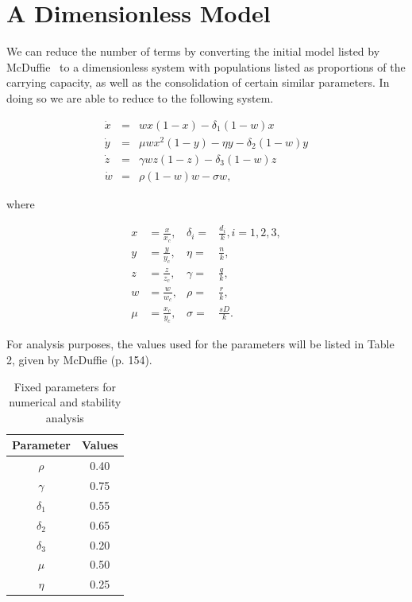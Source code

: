 \documentclass[12pt]{article}
\begin{document}
\section{A Dimensionless Model}
\indent\indent We can reduce the number of terms by converting the initial model listed by McDuffie~\cite{mcduffie} to a dimensionless system with populations listed as proportions of the carrying capacity, as well as the consolidation of certain similar parameters. In doing so we are able to reduce to the following system.

\begin{eqnarray*}
    \Dot{x} & = & wx(1 - x) - \delta_1(1 - w)x\\
    \Dot{y} & = & \mu wx^2(1 - y) - \eta y - \delta_2(1 - w)y\\
    \Dot{z} & = & \gamma wz(1 - z) - \delta_3(1 - w)z\\
    \Dot{w} & = & \rho (1 - w)w - \sigma w ,
\end{eqnarray*}

\noindent where

\begin{align*}
    x &= \frac{x}{x_c}, &\delta_i =& \frac{d_i}{k}, i = 1,2,3,\\
    y &= \frac{y}{y_c}, &\eta =& \frac{n}{k},\\
    z &= \frac{z}{z_c}, &\gamma =& \frac{q}{k},\\
    w &= \frac{w}{w_c}, &\rho =& \frac{r}{k},\\
    \mu &= \frac{x_c}{y_c}, &\sigma =& \frac{sD}{k}.
\end{align*}

For analysis purposes, the values used for the parameters will be listed in Table 2, given by McDuffie (p. 154).

\begin{table}
\centering
\caption{Fixed parameters for numerical and stability analysis}
\begin{tabular}{|c|c|}
\hline
Parameter & Values \\
\hline
\hline
$\rho$ & 0.40 \\
\hline
$\gamma$ & 0.75 \\
\hline
$\delta_1$ & 0.55 \\
\hline
$\delta_2$ & 0.65 \\
\hline
$\delta_3$ & 0.20 \\
\hline 
$\mu$ & 0.50 \\
\hline 
$\eta$ & 0.25 \\
\hline 
\end{tabular}
\end{table}
\end{document}

